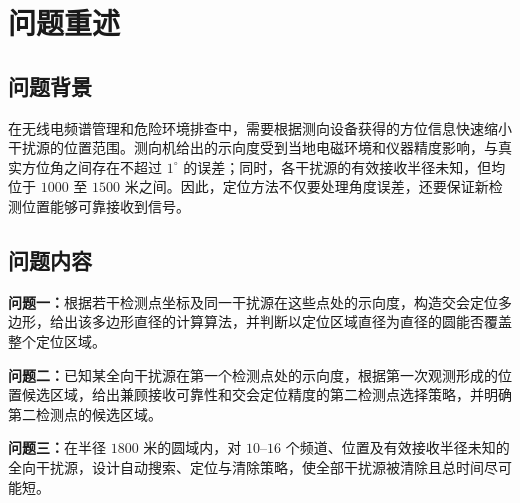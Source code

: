 \section{问题重述}

\subsection{问题背景}

在无线电频谱管理和危险环境排查中，需要根据测向设备获得的方位信息快速缩小干扰源的位置范围。测向机给出的示向度受到当地电磁环境和仪器精度影响，与真实方位角之间存在不超过 $1^\circ$ 的误差；同时，各干扰源的有效接收半径未知，但均位于 $1000$ 至 $1500$ 米之间。因此，定位方法不仅要处理角度误差，还要保证新检测位置能够可靠接收到信号。

\subsection{问题内容}

\textbf{问题一：}根据若干检测点坐标及同一干扰源在这些点处的示向度，构造交会定位多边形，给出该多边形直径的计算算法，并判断以定位区域直径为直径的圆能否覆盖整个定位区域。

\textbf{问题二：}已知某全向干扰源在第一个检测点处的示向度，根据第一次观测形成的位置候选区域，给出兼顾接收可靠性和交会定位精度的第二检测点选择策略，并明确第二检测点的候选区域。

\textbf{问题三：}在半径 $1800$ 米的圆域内，对 $10$--$16$ 个频道、位置及有效接收半径未知的全向干扰源，设计自动搜索、定位与清除策略，使全部干扰源被清除且总时间尽可能短。
